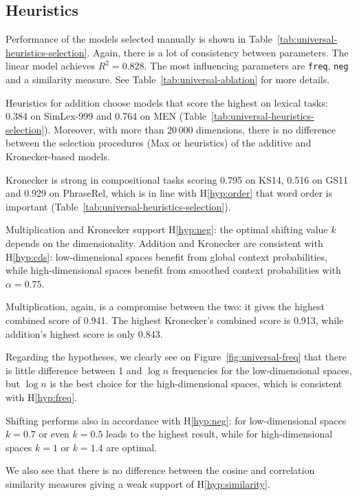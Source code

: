 \subsection{Heuristics}
\label{sec:heuristics-universal}



Performance of the models selected manually is shown in Table~\ref{tab:universal-heuristics-selection}. Again, there is a lot of consistency between parameters. The linear model achieves $R^2 = 0.828$. The most influencing parameters are \texttt{freq}, \texttt{neg} and a similarity measure. See Table~\ref{tab:universal-ablation} for more details.

Heuristics for addition choose models that score the highest on lexical tasks: 0.384 on SimLex-999 and 0.764 on MEN (Table~\ref{tab:universal-heuristics-selection}). Moreover, with more than 20\,000 dimensions, there is no difference between the selection procedures (Max or heuristics) of the additive and Kronecker-based models.

Kronecker is strong in compositional tasks scoring 0.795 on KS14, 0.516 on GS11 and 0.929 on PhraseRel, which is in line with H\ref{hyp:order} that word order is important (Table~\ref{tab:universal-heuristics-selection}).

Multiplication and Kronecker support H\ref{hyp:neg}: the optimal shifting value $k$ depends on the dimensionality. Addition and Kronecker are consistent with H\ref{hyp:cds}: low-dimensional spaces benefit from global context probabilities, while high-dimensional spaces benefit from smoothed context probabilities with $\alpha=0.75$.

Multiplication, again, is a compromise between the two: it gives the highest combined score of 0.941. The highest Kronecker's combined score is 0.913, while addition's highest score is only 0.843.

Regarding the hypotheses, we clearly see on Figure~\ref{fig:universal-freq} that there is little difference between 1 and $\log n$ frequencies for the low-dimensional spaces, but $\log n$ is the best choice for the high-dimensional spaces, which is consistent with H\ref{hyp:freq}.

Shifting performs also in accordance with H\ref{hyp:neg}: for low-dimensional spaces $k=0.7$ or even $k=0.5$ leads to the highest result, while for high-dimensional spaces $k=1$ or $k=1.4$ are optimal.

We also see that there is no difference between the cosine and correlation similarity measures giving a weak support of H\ref{hyp:similarity}.

